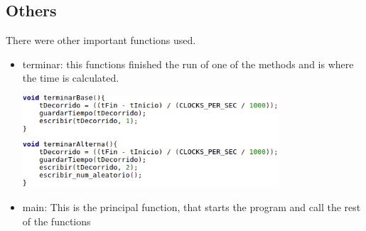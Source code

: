 \documentclass[legalpaper,12pt]{article}
\begin{document}
\subsection{Others}
There were other important functions used.
\begin{itemize}
    \item terminar: this functions finished the run of one of the methods and is where the time is calculated.
    \begin{center}{\includegraphics[width=0.75\textwidth]{terminar.png}\\[1cm]}\end{center}
    \item main: This is the principal function, that starts the program and call the rest of the functions
\end{itemize}
\newpage
\end{document}
